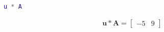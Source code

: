 \begin{lstlisting}[language=Matlab]
u * A
\end{lstlisting}

\begin{solution}
\begin{align*}
    \boldsymbol{u} * \boldsymbol{A} = \begin{bmatrix}
    -5 & 9
    \end{bmatrix}
\end{align*}
\end{solution}